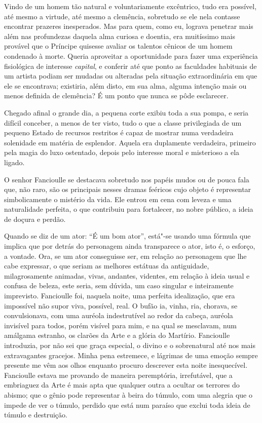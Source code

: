 Vindo de um homem tão natural e voluntariamente excêntrico, tudo era
possível, até mesmo a virtude, até mesmo a clemência, sobretudo se ele nela 
contasse encontrar prazeres inesperados. Mas para quem,
como eu, lograva penetrar mais além nas profundezas daquela
alma curiosa e doentia, era muitíssimo mais provável que o Príncipe
quisesse avaliar os talentos cênicos de um homem condenado à
morte. Queria aproveitar a oportunidade para fazer uma experiência
fisiológica de interesse \textit{capital}, e conferir até que ponto as
faculdades habituais de um artista podiam ser mudadas ou alteradas
pela situação extraordinária em que ele se encontrava;
existiria, além disto, em sua alma, alguma intenção mais ou menos definida
de clemência? É um ponto que nunca se pôde esclarecer.



Chegado afinal o grande dia, a pequena corte exibiu toda a sua pompa,
e seria difícil conceber, a menos de ter visto, tudo o que a classe
privilegiada de um pequeno Estado de recursos restritos é capaz de mostrar
numa verdadeira solenidade em matéria de esplendor. Aquela era duplamente
verdadeira, primeiro pela magia do luxo ostentado, depois pelo
interesse moral e misterioso a ela ligado.

O senhor Fancioulle se destacava sobretudo nos papéis mudos ou de
pouca fala que, não raro, são os principais nesses dramas feéricos
cujo objeto é representar simbolicamente o mistério da vida. Ele entrou
em cena com leveza e uma naturalidade perfeita, o que contribuiu
para fortalecer, no nobre público, a ideia de doçura e perdão.

Quando se diz de um ator: “É um bom ator'',
está"-se usando uma fórmula que implica que por detrás do personagem
ainda transparece o ator, isto é, o esforço, a vontade. Ora, se um ator
conseguisse ser, em relação ao personagem que lhe cabe expressar,
o que seriam as melhores estátuas da antiguidade, milagrosamente
animadas, vivas, andantes, videntes, em relação à ideia usual e
confusa de beleza, este seria, sem dúvida, um caso singular e
inteiramente imprevisto. Fancioulle foi, naquela noite, uma perfeita
idealização, que era impossível não supor viva, possível, real. O bufão
ia, vinha, ria, chorava, se convulsionava, com uma auréola indestrutível
ao redor da cabeça, auréola invisível para todos, porém visível para mim,
e na qual se mesclavam, num amálgama estranho, os clarões da Arte e a
glória do Martírio. Fancioulle introduzia, por não sei que graça
especial, o divino e o sobrenatural até nos mais extravagantes
gracejos. Minha pena estremece, e lágrimas de uma emoção sempre
presente me vêm aos olhos enquanto procuro descrever esta noite
inesquecível. Fancioulle estava me provando de maneira peremptória,
irrefutável, que a embriaguez da Arte é mais apta que qualquer
outra a ocultar os terrores do abismo; que o gênio pode representar
à beira do túmulo, com uma alegria que o impede de ver o túmulo,
perdido que está num paraíso que exclui toda ideia de túmulo e destruição.

